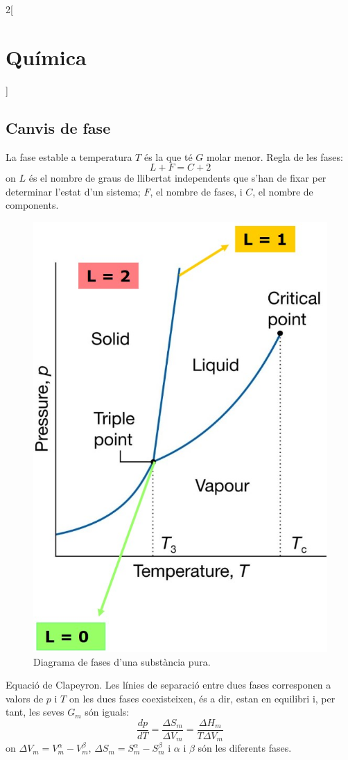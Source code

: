 \documentclass[class=article,10pt,crop=false]{standalone}
\begin{document}
\begin{multicols}{2}[\section{Química}]
\subsection{Canvis de fase}
La fase estable a temperatura $T$ és la que té $G$ molar menor.\newline
Regla de les fases: $$L+F=C+2$$
{\footnotesize on $L$ és el nombre de graus de llibertat independents que s’han de fixar per determinar l’estat d’un sistema; $F$, el nombre de fases, i $C$, el nombre de components.}\newline
\begin{figure}
    \centering
    \includegraphics{Physics/1st/Quimica/Imatges/fases.jpg}
    \caption{Diagrama de fases d'una substància pura.}
\end{figure}
Equació de Clapeyron. Les línies de separació entre dues fases corresponen a valors de $p$ i $T$ on les dues fases coexisteixen, és a dir, estan en equilibri i, per tant, les seves $G_m$ són iguals: $$\frac{dp}{dT}=\frac{\Delta S_m}{\Delta V_m}=\frac{\Delta H_m}{T\Delta V_m}$$ {\footnotesize on $\Delta V_m=V_m^\alpha-V_m^\beta$,  $\Delta S_m=S_m^\alpha-S_m^\beta$ i $\alpha$ i $\beta$ són les diferents fases.}\newline

\end{multicols}
\end{document}

